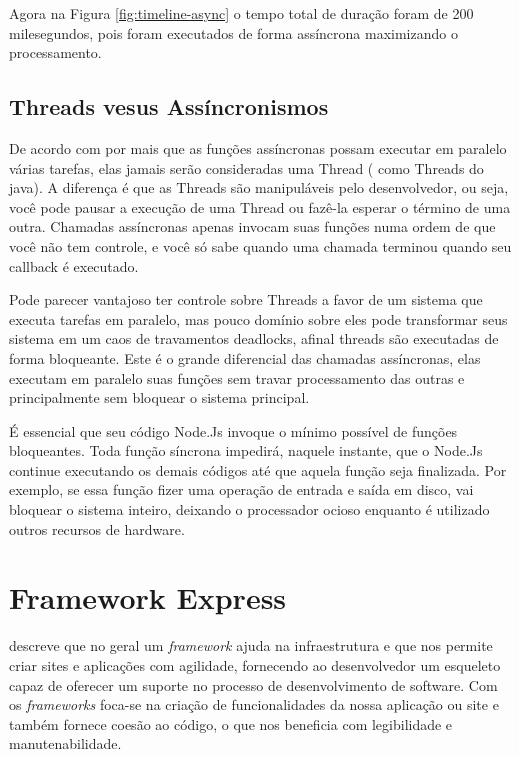   
  Agora na Figura \ref{fig:timeline-async} o tempo total de duração foram de 200 milesegundos, pois foram executados
  de forma assíncrona maximizando o processamento.

\subsection{Threads vesus Assíncronismos}
\label{threads-vs-assincronismo}

  De acordo com \cite{Pereira:2013} por mais que as funções assíncronas possam executar em paralelo várias tarefas,
  elas jamais serão consideradas uma Thread ( como Threads do java). A diferença é que as Threads são manipuláveis 
  pelo desenvolvedor, ou seja, você pode pausar a execução de uma Thread ou fazê-la esperar o término de uma outra. 
  Chamadas assíncronas apenas invocam suas funções numa ordem de que você não tem controle, e você só sabe quando 
  uma chamada terminou quando seu callback é executado.
  
  Pode parecer vantajoso ter controle sobre Threads 
  a favor de um sistema que executa tarefas em paralelo, mas pouco domínio sobre eles pode transformar seus sistema 
  em um caos de travamentos deadlocks, afinal threads são executadas de forma bloqueante. 
  Este é o grande diferencial das chamadas assíncronas, elas executam em paralelo suas funções sem travar 
  processamento das outras e principalmente sem bloquear o sistema principal.
  
  É essencial que seu código Node.Js invoque o mínimo possível de funções bloqueantes. 
  Toda função síncrona impedirá, naquele instante, que o Node.Js continue executando os demais códigos até que aquela 
  função seja finalizada. Por exemplo, se essa função fizer uma operação de entrada e saída em disco, vai bloquear o 
  sistema inteiro, deixando o processador ocioso enquanto é utilizado outros recursos de hardware.\cite{Pereira:2013}

\section{Framework Express}
\label{framework-express}

  \cite{Powers:2012} descreve que no geral um \textit{framework} ajuda na infraestrutura e que nos permite criar sites e aplicações
  com agilidade, fornecendo ao desenvolvedor um esqueleto capaz de oferecer um suporte no processo de desenvolvimento de
  software. Com os \textit{frameworks} foca-se na criação de funcionalidades da nossa aplicação ou site e 
  também fornece coesão ao código, o que nos beneficia com legibilidade e manutenabilidade.

